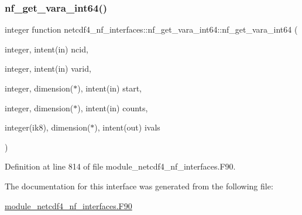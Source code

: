 \subsubsection{\texorpdfstring{nf\+\_\+get\+\_\+vara\+\_\+int64()}{nf\_get\_vara\_int64()}}
{\footnotesize\ttfamily integer function netcdf4\+\_\+nf\+\_\+interfaces\+::nf\+\_\+get\+\_\+vara\+\_\+int64\+::nf\+\_\+get\+\_\+vara\+\_\+int64 (\begin{DoxyParamCaption}\item[{integer, intent(in)}]{ncid,  }\item[{integer, intent(in)}]{varid,  }\item[{integer, dimension($\ast$), intent(in)}]{start,  }\item[{integer, dimension($\ast$), intent(in)}]{counts,  }\item[{integer(ik8), dimension($\ast$), intent(out)}]{ivals }\end{DoxyParamCaption})}



Definition at line 814 of file module\+\_\+netcdf4\+\_\+nf\+\_\+interfaces.\+F90.



The documentation for this interface was generated from the following file\+:\begin{DoxyCompactItemize}
\item 
\hyperlink{module__netcdf4__nf__interfaces_8F90}{module\+\_\+netcdf4\+\_\+nf\+\_\+interfaces.\+F90}\end{DoxyCompactItemize}
